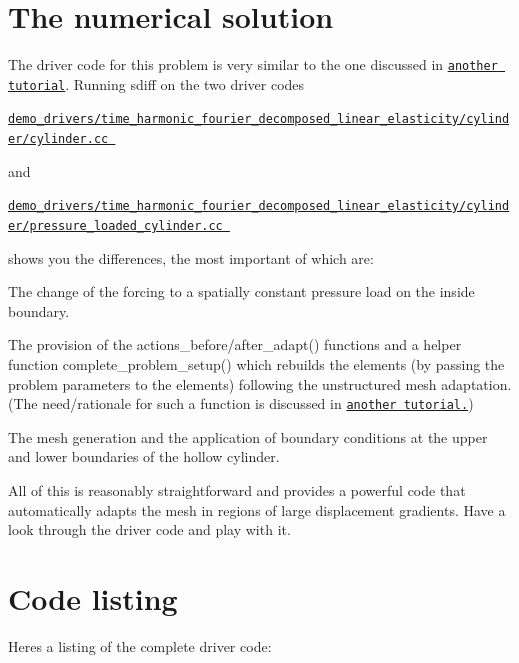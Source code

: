 \hypertarget{index_num}{}\section{The numerical solution}\label{index_num}
The driver code for this problem is very similar to the one discussed in \href{../../cylinder/html/index.html}{\tt another tutorial}. Running {\ttfamily sdiff} on the two driver codes \begin{center} \href{../../../../demo_drivers/time_harmonic_fourier_decomposed_linear_elasticity/cylinder/cylinder.cc}{\tt demo\+\_\+drivers/time\+\_\+harmonic\+\_\+fourier\+\_\+decomposed\+\_\+linear\+\_\+elasticity/cylinder/cylinder.\+cc } \end{center}  and \begin{center} \href{../../../../demo_drivers/time_harmonic_fourier_decomposed_linear_elasticity/cylinder/pressure_loaded_cylinder.cc}{\tt demo\+\_\+drivers/time\+\_\+harmonic\+\_\+fourier\+\_\+decomposed\+\_\+linear\+\_\+elasticity/cylinder/pressure\+\_\+loaded\+\_\+cylinder.\+cc } \end{center}  shows you the differences, the most important of which are\+:
\begin{DoxyItemize}
\item The change of the forcing to a spatially constant pressure load on the inside boundary.
\item The provision of the {\ttfamily actions\+\_\+before/after\+\_\+adapt}() functions and a helper function {\ttfamily complete\+\_\+problem\+\_\+setup()} which rebuilds the elements (by passing the problem parameters to the elements) following the unstructured mesh adaptation. (The need/rationale for such a function is discussed in \href{../../../meshes/mesh_from_inline_triangle/html/index.html}{\tt another tutorial.})
\item The mesh generation and the application of boundary conditions at the upper and lower boundaries of the hollow cylinder.
\end{DoxyItemize}All of this is reasonably straightforward and provides a powerful code that automatically adapts the mesh in regions of large displacement gradients. Have a look through the driver code and play with it.



 

\hypertarget{index_code}{}\section{Code listing}\label{index_code}
Here\textquotesingle{}s a listing of the complete driver code\+:


